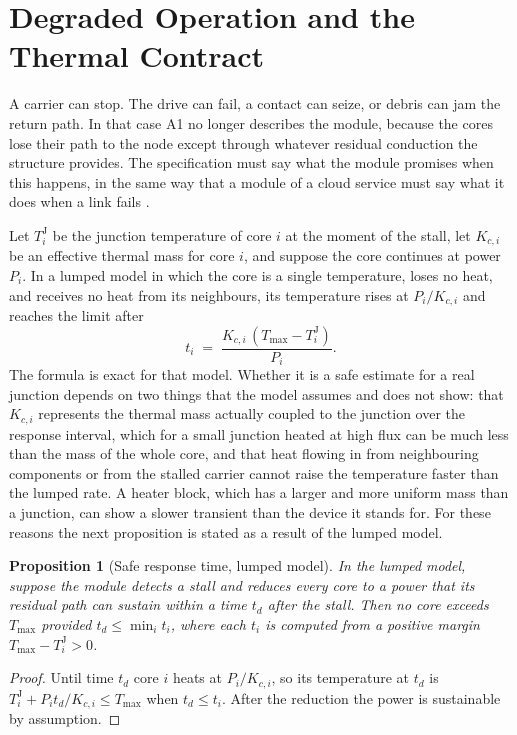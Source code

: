 \documentclass[11pt]{article}
\theoremstyle{definition}
\theoremstyle{plain}
\newtheorem{proposition}{Proposition}[section]
\theoremstyle{remark}
\begin{document}
\section{Degraded Operation and the Thermal Contract}
\label{sec:degraded}

A carrier can stop. The drive can fail, a contact can seize, or debris can jam the return path. In that case A1 no longer describes the module, because the cores lose their path to the node except through whatever residual conduction the structure provides. The specification must say what the module promises when this happens, in the same way that a module of a cloud service must say what it does when a link fails \cite{flyxion-gpu}.

Let $T^{\mathrm J}_i$ be the junction temperature of core $i$ at the moment of the stall, let $K_{c,i}$ be an effective thermal mass for core $i$, and suppose the core continues at power $P_i$. In a lumped model in which the core is a single temperature, loses no heat, and receives no heat from its neighbours, its temperature rises at $P_i/K_{c,i}$ and reaches the limit after
\[
t_i \;=\; \frac{K_{c,i}\,(T_{\max}-T^{\mathrm J}_i)}{P_i}.
\]
The formula is exact for that model. Whether it is a safe estimate for a real junction depends on two things that the model assumes and does not show: that $K_{c,i}$ represents the thermal mass actually coupled to the junction over the response interval, which for a small junction heated at high flux can be much less than the mass of the whole core, and that heat flowing in from neighbouring components or from the stalled carrier cannot raise the temperature faster than the lumped rate. A heater block, which has a larger and more uniform mass than a junction, can show a slower transient than the device it stands for. For these reasons the next proposition is stated as a result of the lumped model.

\begin{proposition}[Safe response time, lumped model]\label{prop:stall}
In the lumped model, suppose the module detects a stall and reduces every core to a power that its residual path can sustain within a time $t_d$ after the stall. Then no core exceeds $T_{\max}$ provided $t_d\le\min_i t_i$, where each $t_i$ is computed from a positive margin $T_{\max}-T^{\mathrm J}_i>0$.
\end{proposition}
\begin{proof}
Until time $t_d$ core $i$ heats at $P_i/K_{c,i}$, so its temperature at $t_d$ is $T^{\mathrm J}_i+P_it_d/K_{c,i}\le T_{\max}$ when $t_d\le t_i$. After the reduction the power is sustainable by assumption.
\end{proof}
\end{document}
